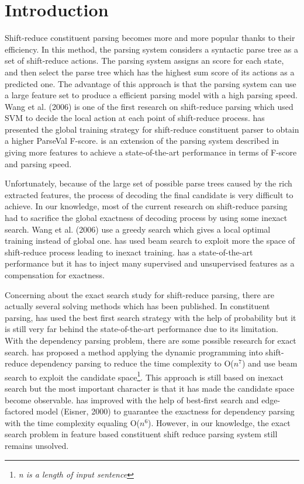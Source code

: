 \section {Introduction}
Shift-reduce constituent parsing becomes more and more popular thanks to their efficiency. In this method, the parsing system considers a syntactic parse tree as a set of shift-reduce actions. The parsing system assigns an score for each state, and then select the parse tree which has the highest sum score of its actions as a predicted one. The advantage of this approach is that the parsing system can use a large feature set to produce a efficient parsing model with a high parsing speed. Wang et al. (2006) is one of the first research on shift-reduce parsing which used SVM to decide the local action at each point of shift-reduce process. \cite{ref:2009Zhang} has presented the global training strategy for shift-reduce constituent parser to obtain a higher ParseVal F-score. \cite{ref:2012Zhu} is an extension of the parsing system described in \cite{ref:2009Zhang} giving more features to achieve a state-of-the-art performance in terms of F-score and parsing speed.

Unfortunately, because of the large set of possible parse trees caused by the rich extracted features, the process of decoding the final candidate is very difficult to achieve. In our knowledge, most of the current research on shift-reduce parsing had to sacrifice the global exactness of decoding process by using some inexact search. Wang et al. (2006) use a greedy search which gives a local optimal training instead of global one. \cite{ref:2009Zhang} has used beam search to exploit more the space of shift-reduce process leading to inexact training. \cite{ref:2012Zhu} has a state-of-the-art performance but it has to inject many supervised and unsupervised features  as a compensation for exactness. 

Concerning about the exact search study for shift-reduce parsing, there are actually several solving methods which has been published. In constituent parsing, \cite{ref:2006Sagae} has used the best first search strategy with the help of probability but it is still very far behind the state-of-the-art performance due to its limitation. With the dependency parsing problem, there are some possible research for exact search. \cite{ref:2010Huang} has proposed a method applying the dynamic programming into shift-reduce dependency parsing to reduce the time complexity to O($n^7$) and use beam search to exploit the candidate space\footnote{\textit{n is a length of input sentence}}. This approach is still based on inexact search but the most important character is that it has made the candidate space become observable. \cite{ref:2013Zhao} has improved \cite{ref:2010Huang} with the help of best-first search and edge-factored model (Eisner, 2000) to guarantee the exactness for dependency parsing with the time complexity equaling O($n^6$). However, in our knowledge, the exact search problem in feature based constituent shift reduce parsing system  \cite{ref:2009Zhang} still remains unsolved.

